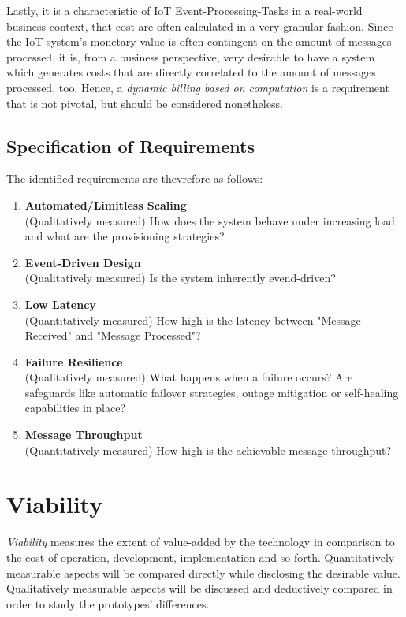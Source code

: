 Lastly, it is a characteristic of IoT Event-Processing-Tasks in a real-world business context, that cost are often calculated in a very granular fashion. Since the IoT system's monetary value is often contingent on the amount of messages processed, it is, from a business perspective, very desirable to have a system which generates costs that are directly correlated to the amount of messages processed, too. Hence, a \textit{dynamic billing based on computation} is a requirement that is not pivotal, but should be considered nonetheless.

\subsection{Specification of Requirements}

The identified requirements are thevrefore as follows:

\begin{enumerate}
    \item \textbf{Automated/Limitless Scaling}\\
        (Qualitatively measured) How does the system behave under increasing load and what are the provisioning strategies?
    \item \textbf{Event-Driven Design}\\
        (Qualitatively measured) Is the system inherently evend-driven?
    \item \textbf{Low Latency}\\
        (Quantitatively measured) How high is the latency between "Message Received" and "Message Processed"?
    \item \textbf{Failure Resilience}\\
        (Qualitatively measured) What happens when a failure occurs? Are safeguards like automatic failover strategies, outage mitigation or self-healing capabilities in place?
    \item \textbf{Message Throughput}\\
        (Quantitatively measured) How high is the achievable message throughput?
\end{enumerate}



\section{Viability}

\textit{Viability} measures the extent of value-added by the technology in comparison to the cost of operation, development, implementation and so forth. Quantitatively measurable aspects will be compared directly while disclosing the desirable value. Qualitatively measurable aspects will be discussed and deductively compared in order to study the prototypes' differences. 

